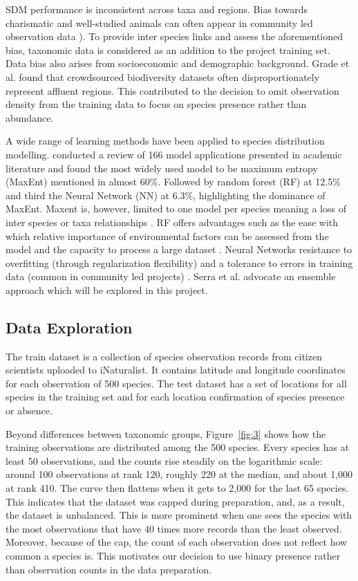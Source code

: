 \documentclass{article}
\begin{document}
SDM performance is inconsistent across taxa and regions. Bias towards charismatic and well-studied animals can often appear in community led observation data \cite{lange2025feedforwardfewshotspeciesrange}). To provide inter species links and assess the aforementioned bias, taxonomic data is considered as an addition to the project training set. Data bias also arises from socioeconomic and demographic background. Grade et al. \cite{10.1371/journal.pone.0277223} found that crowdsourced biodiversity datasets often disproportionately represent affluent regions. This contributed to the decision to omit observation density from the training data to focus on species presence rather than abundance.

A wide range of learning methods have been applied to species distribution modelling. \cite{SERRA2026103563} conducted a review of 166 model applications presented in academic literature and found the most widely used model to be maximum entropy (MaxEnt) mentioned in almost 60\%. Followed by random forest (RF) at 12.5\% and third the Neural Network (NN) at 6.3\%, highlighting the dominance of MaxEnt. Maxent is, however, limited to one model per species meaning a loss of inter species or taxa relationships \cite{https://doi.org/10.1111/2041-210x.70262}. RF offers advantages such as the ease with which relative importance of environmental factors can be assessed from the model and the capacity to process a large dataset \cite{https://doi.org/10.1111/j.2006.0906-7590.04596.x}. Neural Networks resistance to overfitting (through regularization flexibility) and a tolerance to errors in training data (common in community led projects) \cite{Worner2014Invasive}. Serra et al. \cite{SERRA2026103563}  advocate an ensemble approach which will be explored in this project.

\subsection{Data Exploration}\label{app:data_exp}

The train dataset is a collection of species observation records from citizen scientists uploaded to iNaturalist. It contains latitude and longitude coordinates for each observation of 500 species. The test dataset has a set of locations for all species in the training set and for each location confirmation of species presence or absence.

Beyond differences between taxonomic groups, Figure~\ref{fig:3} shows how the training observations are distributed among the 500 species. Every species has at least 50 observations, and the counts rise steadily on the logarithmic scale: around 100 observations at rank 120, roughly 220 at the median, and about 1,000 at rank 410. The curve then flattens when it gets to 2,000 for the last 65 species. This indicates that the dataset was capped during preparation, and, as a result, the dataset is unbalanced. This is more prominent when one sees the species with the most  observations that have 40 times more records than the least observed. Moreover, because of the cap, the count of each observation does not reflect how common a species is. This motivates our decision to use binary presence rather than observation counts in the data preparation.
\end{document}
